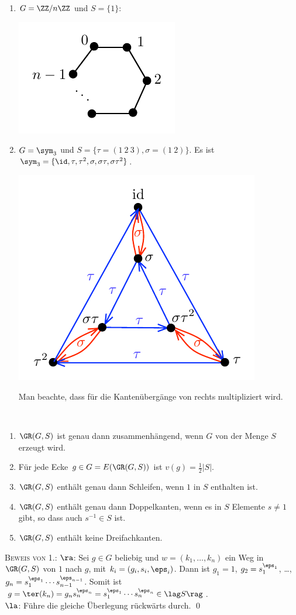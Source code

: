 \begin{enumerate}
\item $G=\ZZ/n\ZZ$ und $S=\{1\}$:
\begin{center}
	\includegraphics{grugraImages/cay4}
\end{center}
\item $G=\sym_3$ und $S=\{\tau=(1\ 2\ 3),\sigma=(1\ 2)\}$.
Es ist $\sym_3=\{\id,\tau,\tau^2,\sigma,\sigma\tau,\sigma\tau^2\}$.
\begin{center}
	\includegraphics{grugraImages/cay5}
\end{center}
Man beachte, dass für die Kantenübergänge von rechts multipliziert 
wird.
\end{enumerate}

\BEM\label{bem_GRGS}\
\begin{enumerate}
\item $\GR(G,S)$ ist genau dann zusammenhängend, wenn
$G$ von der Menge $S$ erzeugt wird.
\item Für jede Ecke $g\in G=E(\GR(G,S))$ ist $v(g)=\frac{1}{2}|S|$.
\item $\GR(G,S)$ enthält genau dann Schleifen, wenn $1$ in $S$
enthalten ist.
\item $\GR(G,S)$ enthält genau dann Doppelkanten, wenn es in $S$
Elemente $s\neq 1$ gibt, so dass auch $s^{-1}\in S$ ist.
\item $\GR(G,S)$ enthält keine Dreifachkanten.
\end{enumerate}
\textsc{Beweis von 1.:} \glqq$\ra$\grqq: Sei $g\in G$ beliebig und
$w=(k_1,\ldots,k_n)$ ein Weg in $\GR(G,S)$ von $1$ nach $g$,
mit $k_i=(g_i, s_i, \eps_i)$. Dann ist
$g_1=1$, $g_2=s_1^{\eps_1}$, \ldots,
$g_n=s_1^{\eps_1}\cdots s_{n-1}^{\eps_{n-1}}$.
Somit ist $g=\ter(k_n)=g_n s_n^{\eps_n}=
s_1^{\eps_1}\cdots s_n^{\eps_n} \in\lag S\rag$.\\
\glqq $\la$\grqq: Führe die gleiche Überlegung rückwärts durch.
\qed


